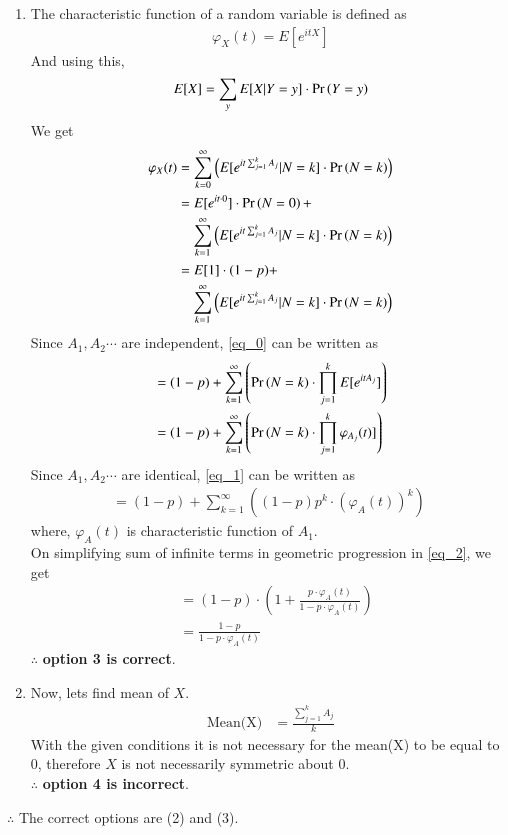 \documentclass[journal,12pt,twocolumn]{IEEEtran}
\begin{document}
\begin{enumerate}
\item The characteristic function of a random variable is defined as
\begin{align}
    \varphi_X(t)=E[e^{itX}]
\end{align}
And using this,
\begin{align}
    E[X]=\sum_{y} E[X|Y=y]\cdot \Pr\left(Y=y\right)
\end{align}
We get 
\begin{align}
    \varphi_X(t)&=\sum_{k=0}^{\infty}\left(E[e^{it\sum_{j=1}^{k} A_j}
    |N=k]\cdot \pr{N=k}\right)\\
    &\begin{multlined}
    =E[e^{it\cdot 0}]\cdot \pr{N=0}+\\
    \sum_{k=1}^{\infty}\left(E[e^{it\sum_{j=1}^{k} A_j}
    |N=k]\cdot \pr{N=k}\right)
    \end{multlined}\\
    &\begin{multlined}
    =E[1]\cdot (1-p)+\\
    \sum_{k=1}^{\infty}\left(E[e^{it\sum_{j=1}^{k} A_j}|N=k]\cdot \pr{N=k}\right) \label{eq_0}
    \end{multlined}\\
\end{align}
Since $A_1,A_2\cdots$ are independent, \eqref{eq_0} can be written as
\begin{align}
    &=(1-p)+\sum_{k=1}^{\infty}\left(\Pr\left(N=k\right)\cdot\prod_{j=1}^k E[e^{itA_j}]\right) \\
    &=(1-p)+\sum_{k=1}^{\infty}\left(\Pr\left(N=k\right)\cdot\prod_{j=1}^k \varphi_{A_j}(t)]\right) \label{eq_1}
\end{align}
Since $A_1,A_2\cdots$ are identical, \eqref{eq_1} can be written as
\begin{align}
    =(1-p)+\sum_{k=1}^{\infty}\left((1-p)p^k\cdot(\varphi_{A}(t))^k\right)\;\label{eq_2}
\end{align}
where, $\varphi_{A}(t)$ is characteristic function of $A_1$.\\
On simplifying sum of infinite terms in geometric progression in \eqref{eq_2}, we get
\begin{align}
    &=(1-p)\cdot \left(1+\frac{p\cdot \varphi_A(t)}{1-p\cdot \varphi_A(t)}\right)\\
    &=\frac{1-p}{1-p\cdot \varphi_A(t) }
\end{align}
$\therefore$ \textbf{option 3 is correct}.\\

\item Now, lets find mean of $X$.
\begin{align}
    \text{Mean(X)}&=\frac{\sum_{j=1}^{k} A_j}{k}
\end{align}
With the given conditions it is not necessary for the mean(X) to be equal to 0, therefore $X$ is not necessarily symmetric about 0.\\
$\therefore$ \textbf{option 4 is incorrect}.
\end{enumerate}
$\therefore$ The correct options are (2) and (3).
\end{document}
